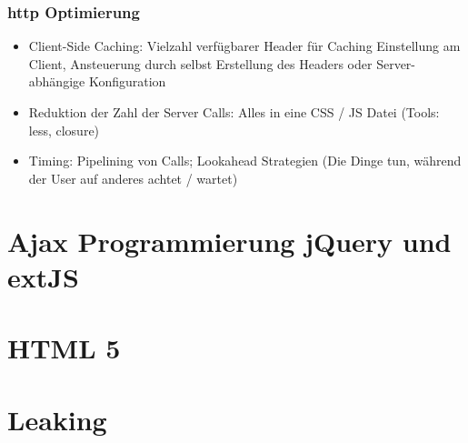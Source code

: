 \documentclass{article} %
\begin{document}
	\subsubsection{http Optimierung}
	\begin{itemize}
		\item Client-Side Caching: Vielzahl verfügbarer Header für Caching Einstellung am Client, Ansteuerung durch selbst Erstellung des Headers oder Server-abhängige Konfiguration
		\item Reduktion der Zahl der Server Calls: Alles in eine CSS / JS Datei (Tools: less, closure)
		\item Timing: Pipelining von Calls; Lookahead Strategien (Die Dinge tun, während der User auf anderes achtet / wartet)
	\end{itemize}
\section{Ajax Programmierung jQuery und extJS}
\section{HTML 5}
\section{Leaking}
\end{document}
